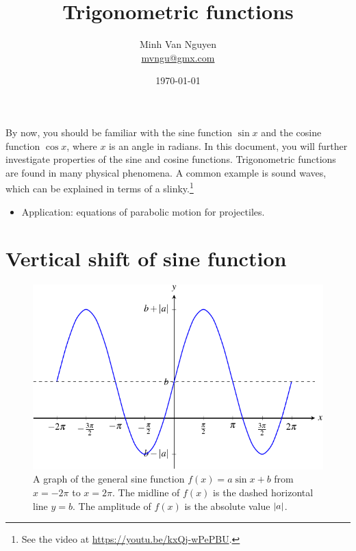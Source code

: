 \documentclass[a4paper,oneside,12pt]{article}
\begin{document}
\title{\Large\bf Trigonometric functions}
\author{%
  Minh Van Nguyen \\
  \url{mvngu@gmx.com}
}
\date{\today}
\maketitle

\noindent
By now, you should be familiar with the sine function $\sin x$ and the
cosine function $\cos x$, where $x$ is an angle in radians.  In this
document, you will further investigate properties of the sine and
cosine functions.  Trigonometric functions are found in many physical
phenomena.  A common example is sound waves, which can be explained in
terms of a slinky.\footnote{
  See the video at
  \url{https://youtu.be/kxQj-wPePBU}.
}

\begin{itemize}
\item Application: equations of parabolic motion for projectiles.
\end{itemize}



\section{Vertical shift of sine function}

\begin{figure}[!htbp]
\centering
\includegraphics[scale=1.1]{image/13/a-sin-b.pdf}
\caption{%
  A graph of the general sine function
  $f(x) = a \sin x + b$ from $x = -2\pi$ to $x = 2\pi$.  The midline
  of $f(x)$ is the dashed horizontal line $y = b$.  The amplitude of
  $f(x)$ is the absolute value $\lvert a\rvert$.
}
\label{fig:trigonometric:general_sine}
\end{figure}
\end{document}
